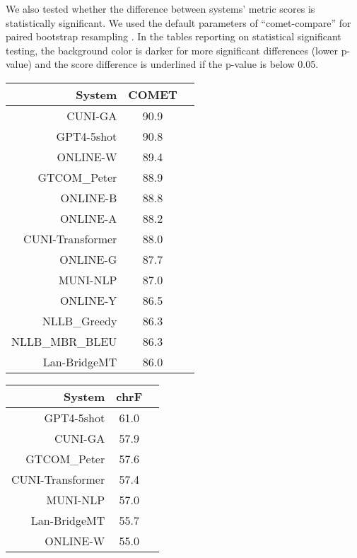 \documentclass[11pt]{article}
\begin{document}
We also tested whether the difference between systems' metric scores is statistically significant. We used the default parameters of ``comet-compare'' for paired bootstrap resampling \citep{koehn-2004-statistical}. In the tables reporting on statistical significant testing, the background color is darker for more significant differences (lower p-value) and the score difference is underlined if the p-value is below 0.05.
\clearpage
\begin{table}[]  
\scriptsize
\begin{subtable}[t]{0.33\textwidth}
\begin{tabular}{rcc}
\toprule 
System  & COMET \\ 
\midrule 
CUNI-GA  & 90.9 \\ 
\rowcolor{ashgrey} GPT4-5shot   & 90.8 \\ 
\rowcolor{ashgrey} ONLINE-W   & 89.4 \\ 
\rowcolor{ashgrey} GTCOM\_Peter   & 88.9 \\ 
\rowcolor{ashgrey} ONLINE-B   & 88.8 \\ 
\rowcolor{ashgrey} ONLINE-A   & 88.2 \\ 
CUNI-Transformer  & 88.0 \\ 
\rowcolor{ashgrey} ONLINE-G   & 87.7 \\ 
MUNI-NLP  & 87.0 \\ 
\rowcolor{ashgrey} ONLINE-Y   & 86.5 \\ 
\rowcolor{ashgrey} NLLB\_Greedy   & 86.3 \\ 
\rowcolor{ashgrey} NLLB\_MBR\_BLEU   & 86.3 \\ 
\rowcolor{ashgrey} Lan-BridgeMT   & 86.0 \\ 
\bottomrule 
\end{tabular} 
\end{subtable}
\begin{subtable}[t]{0.33\textwidth}
\begin{tabular}{rcc}
\toprule 
System  & chrF \\ 
\midrule 
\rowcolor{ashgrey} GPT4-5shot   & 61.0 \\ 
CUNI-GA & 57.9 \\ 
\rowcolor{ashgrey} GTCOM\_Peter   & 57.6 \\ 
CUNI-Transformer  & 57.4 \\ 
MUNI-NLP  & 57.0 \\ 
\rowcolor{ashgrey} Lan-BridgeMT   & 55.7 \\ 
\rowcolor{ashgrey} ONLINE-W   & 55.0 \\ 

\end{tabular}
\end{subtable}
\end{table}
\end{document}
